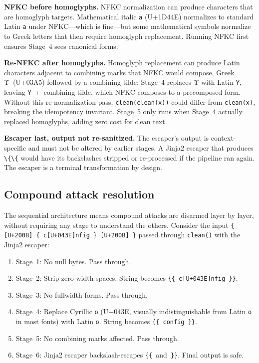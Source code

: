 \documentclass[11pt,letterpaper]{article}
\begin{document}
\textbf{NFKC before homoglyphs.} NFKC normalization can produce characters that are homoglyph targets. Mathematical italic \texttt{a} (U+1D44E) normalizes to standard Latin \texttt{a} under NFKC---which is fine---but some mathematical symbols normalize to Greek letters that then require homoglyph replacement. Running NFKC first ensures Stage~4 sees canonical forms.

\textbf{Re-NFKC after homoglyphs.} Homoglyph replacement can produce Latin characters adjacent to combining marks that NFKC would compose. Greek Υ~(U+03A5) followed by a combining tilde: Stage~4 replaces Υ with Latin \texttt{Y}, leaving \texttt{Y}~+~combining tilde, which NFKC composes to a precomposed form. Without this re-normalization pass, \texttt{clean(clean(x))} could differ from \texttt{clean(x)}, breaking the idempotency invariant. Stage~5 only runs when Stage~4 actually replaced homoglyphs, adding zero cost for clean text.

\textbf{Escaper last, output not re-sanitized.} The escaper's output is context-specific and must not be altered by earlier stages. A Jinja2 escaper that produces \texttt{\textbackslash\{\textbackslash\{} would have its backslashes stripped or re-processed if the pipeline ran again. The escaper is a terminal transformation by design.

\subsection{Compound attack resolution}

The sequential architecture means compound attacks are disarmed layer by layer, without requiring any stage to understand the others. Consider the input \texttt{\{ [U+200B] \{ c[U+043E]nfig \} [U+200B] \}} passed through \texttt{clean()} with the Jinja2 escaper:

\begin{enumerate}
\item Stage~1: No null bytes. Pass through.
\item Stage~2: Strip zero-width spaces. String becomes \texttt{\{\{ c[U+043E]nfig \}\}}.
\item Stage~3: No fullwidth forms. Pass through.
\item Stage~4: Replace Cyrillic \texttt{о} (U+043E, visually indistinguishable from Latin \texttt{o} in most fonts) with Latin \texttt{o}. String becomes \texttt{\{\{ config \}\}}.
\item Stage~5: No combining marks affected. Pass through.
\item Stage~6: Jinja2 escaper backslash-escapes \texttt{\{\{}~and~\texttt{\}\}}. Final output is safe.
\end{enumerate}
\end{document}
